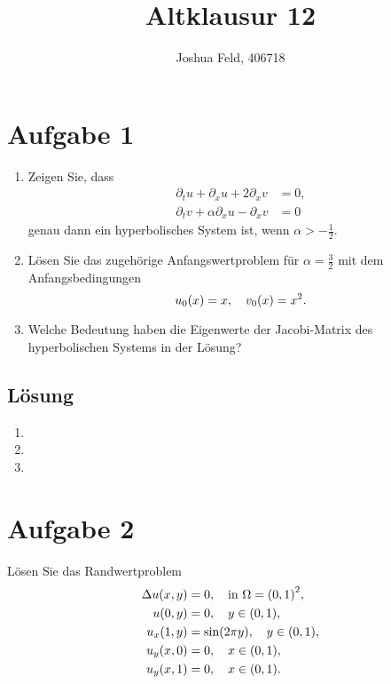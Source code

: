 \documentclass{exercise}
\institute{Applied and Computational Mathematics}
\title{Altklausur 12}
\author{Joshua Feld, 406718}
\begin{document}
    \maketitle


    \section*{Aufgabe 1}
    
    \begin{problem}
        \begin{enumerate}
            \item Zeigen Sie, dass
            \begin{align*}
                \partial_t u + \partial_x u + 2\partial_x v &= 0,\\
                \partial_t v + \alpha\partial_x u - \partial_x v &= 0
            \end{align*}
            genau dann ein hyperbolisches System ist, wenn \(\alpha > -\frac{1}{2}\).
            \item Lösen Sie das zugehörige Anfangswertproblem für \(\alpha = \frac{3}{2}\) mit dem Anfangsbedingungen
            \[
                u_0\parentheses*{x} = x, \quad v_0\parentheses*{x} = x^2.
            \]
            \item Welche Bedeutung haben die Eigenwerte der Jacobi-Matrix des hyperbolischen Systems in der Lösung?
        \end{enumerate}
    \end{problem}
    
    \subsection*{Lösung}
    \begin{enumerate}
        \item
        \item
        \item
    \end{enumerate}


    \section*{Aufgabe 2}
    
    \begin{problem}
        Lösen Sie das Randwertproblem
        \begin{align*}
            \Delta u\parentheses*{x, y} &= 0, \quad \text{in }\Omega = \parentheses*{0, 1}^2,\\
            u\parentheses*{0, y} &= 0, \quad y \in \parentheses*{0, 1},\\
            u_x\parentheses*{1, y} &= \sin\parentheses*{2\pi y}, \quad y \in \parentheses*{0, 1},\\
            u_y\parentheses*{x, 0} &= 0, \quad x \in \parentheses*{0, 1},\\
            u_y\parentheses*{x, 1} &= 0, \quad x \in \parentheses*{0, 1}.
        \end{align*}
    \end{problem}
    
\end{document}
